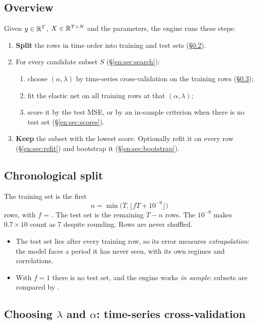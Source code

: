 \subsection{Overview}
Given $y\in\mathbb{R}^T$, $X\in\mathbb{R}^{T\times N}$ and the parameters, the engine runs these steps:
\begin{enumerate}
  \item \textbf{Split} the rows in time order into training and test sets (\S\ref{en:sec:split}).
  \item For every candidate subset $S$ (\S\ref{en:sec:search}):
  \begin{enumerate}
    \item choose $(\alpha,\lambda)$ by time-series cross-validation on the training rows
          (\S\ref{en:sec:cv});
    \item fit the elastic net on all training rows at that $(\alpha,\lambda)$;
    \item score it by the test MSE, or by an in-sample criterion when there is no test set
          (\S\ref{en:sec:scores}).
  \end{enumerate}
  \item \textbf{Keep} the subset with the lowest score. Optionally refit it on every row
        (\S\ref{en:sec:refit}) and bootstrap it (\S\ref{en:sec:bootstrap}).
\end{enumerate}

\subsection{Chronological split}\label{en:sec:split}
The training set is the first
\[
  n=\min\big(T,\lfloor fT+10^{-9}\rfloor\big)
\]
rows, with $f$ = . The test set is the remaining $T-n$ rows. The
$10^{-9}$ makes $0.7\times10$ count as 7 despite rounding. Rows are never shuffled.
\begin{itemize}
  \item The test set lies after every training row, so its error measures
        \emph{extrapolation}: the model faces a period it has never seen, with its own
        regimes and correlations.
  \item With $f=1$ there is no test set, and the engine works \emph{in sample}: subsets are
        compared by .
\end{itemize}

\subsection{\texorpdfstring{Choosing $\lambda$ and $\alpha$}{Choosing lambda and alpha}: time-series cross-validation}\label{en:sec:cv}

